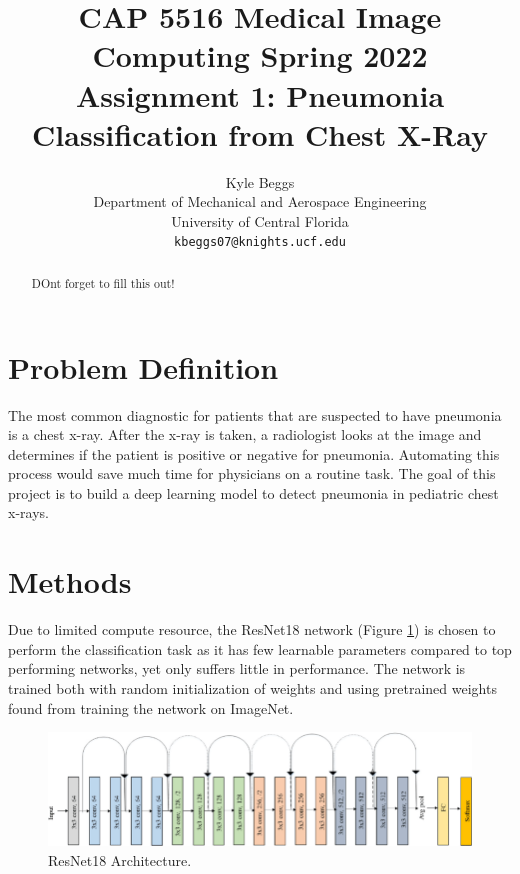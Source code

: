 \documentclass[10pt,twocolumn,letterpaper]{article}
\begin{document}
\title{CAP 5516 Medical Image Computing Spring 2022 Assignment 1: Pneumonia Classification from Chest X-Ray}

\author{Kyle Beggs\\
Department of Mechanical and Aerospace Engineering\\ 
University of Central Florida\\
{\tt\small kbeggs07@knights.ucf.edu}}

\maketitle
\ificcvfinal\thispagestyle{empty}\fi


\begin{abstract}
    DOnt forget to fill this out!
\end{abstract}


\section{Problem Definition}

The most common diagnostic for patients that are suspected to have pneumonia is a chest x-ray. After the x-ray is taken, a radiologist looks at the image and determines if the patient is positive or negative for pneumonia. Automating this process would save much time for physicians on a routine task. The goal of this project is to build a deep learning model to detect pneumonia in pediatric chest x-rays.


\section{Methods}
Due to limited compute resource, the ResNet18 network (Figure \ref{fig:fig1}) is chosen to perform the classification task as it has few learnable parameters compared to top performing networks, yet only suffers little in performance. The network is trained both with random initialization of weights and using pretrained weights found from training the network on ImageNet.

\begin{figure}[h]
\begin{center}
   \includegraphics[width=0.95\linewidth]{images/Original-ResNet-18-Architecture.png}
\end{center}
   \caption{ResNet18 Architecture.}
\label{fig:fig1}
\end{figure}
\end{document}
